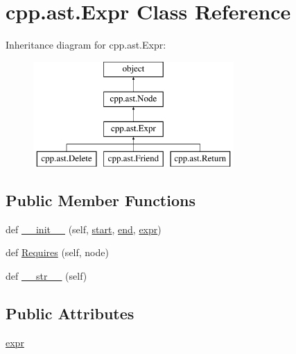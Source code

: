 \hypertarget{classcpp_1_1ast_1_1Expr}{}\section{cpp.\+ast.\+Expr Class Reference}
\label{classcpp_1_1ast_1_1Expr}
Inheritance diagram for cpp.\+ast.\+Expr\+:\begin{figure}[H]
\begin{center}
\leavevmode
\includegraphics[height=4.000000cm]{classcpp_1_1ast_1_1Expr}
\end{center}
\end{figure}
\subsection*{Public Member Functions}
\begin{DoxyCompactItemize}
\item 
def \mbox{\hyperlink{classcpp_1_1ast_1_1Expr_adc83f4b17d6e28a39781678692eb25aa}{\+\_\+\+\_\+init\+\_\+\+\_\+}} (self, \mbox{\hyperlink{classcpp_1_1ast_1_1Node_a7b2aa97e6a049bb1a93aea48c48f1f44}{start}}, \mbox{\hyperlink{classcpp_1_1ast_1_1Node_a3c5e5246ccf619df28eca02e29d69647}{end}}, \mbox{\hyperlink{classcpp_1_1ast_1_1Expr_a2f4e13fb0176f2616f8703103c806462}{expr}})
\item 
def \mbox{\hyperlink{classcpp_1_1ast_1_1Expr_a9c92416eb1285068f190dcda8fd33682}{Requires}} (self, node)
\item 
def \mbox{\hyperlink{classcpp_1_1ast_1_1Expr_a7ee1896fbfa7819adbd0b2f89d11ecec}{\+\_\+\+\_\+str\+\_\+\+\_\+}} (self)
\end{DoxyCompactItemize}
\subsection*{Public Attributes}
\begin{DoxyCompactItemize}
\item 
\mbox{\hyperlink{classcpp_1_1ast_1_1Expr_a2f4e13fb0176f2616f8703103c806462}{expr}}
\end{DoxyCompactItemize}


